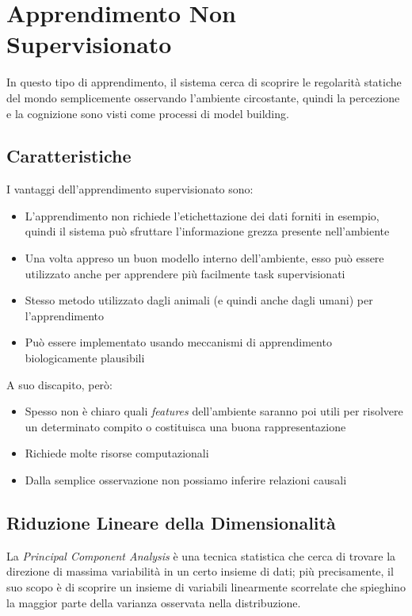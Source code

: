\newpage
\section{Apprendimento Non Supervisionato}
In questo tipo di apprendimento, il sistema cerca di scoprire le regolarità statiche del mondo semplicemente osservando l'ambiente circostante, quindi la percezione e la cognizione sono visti come processi di model building.
\subsection{Caratteristiche}
I vantaggi dell'apprendimento supervisionato sono:
\begin{itemize}
    \item L'apprendimento non richiede l'etichettazione dei dati forniti in esempio, quindi il sistema può sfruttare l'informazione grezza presente nell'ambiente
    \item Una volta appreso un buon modello interno dell'ambiente, esso può essere utilizzato anche per apprendere più facilmente task supervisionati
    \item Stesso metodo utilizzato dagli animali (e quindi anche dagli umani) per l'apprendimento
    \item Può essere implementato usando meccanismi di apprendimento biologicamente plausibili
\end{itemize}
A suo discapito, però:
\begin{itemize}
    \item Spesso non è chiaro quali \textit{features} dell'ambiente saranno poi utili per risolvere un determinato compito o costituisca una buona rappresentazione
    \item Richiede molte risorse computazionali
    \item Dalla semplice osservazione non possiamo inferire relazioni causali
\end{itemize}

\subsection{Riduzione Lineare della Dimensionalità}
La \textit{Principal Component Analysis} è una tecnica statistica che cerca di trovare la direzione di massima variabilità in un certo insieme di dati; più precisamente, il suo scopo è di scoprire un insieme di variabili linearmente scorrelate che spieghino la maggior parte della varianza osservata nella distribuzione.
